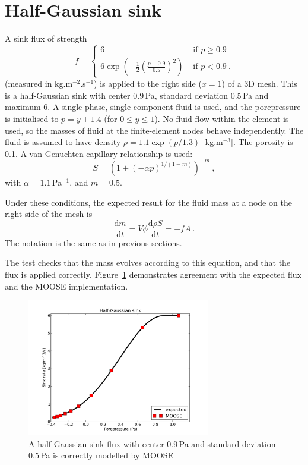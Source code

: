 \documentclass[]{scrreprt}
\def\d{\mathrm{d}}
\begin{document}
\section{Half-Gaussian sink}
\label{half_gaussian.sec}

A sink flux of strength
\begin{equation}
f = \left\{
\begin{array}{ll}
6 & \mbox{ if } p \geq 0.9 \\
6\exp\left(-\frac{1}{2} \left(\frac{p-0.9}{0.5} \right)^{2}\right) & \mbox { if } p < 0.9 \ .
\end{array}
\right.
\end{equation}
(measured in kg.m$^{-2}$.s$^{-1}$) is applied to the right side
($x=1$) of a 3D mesh.  This is a half-Gaussian sink with center
0.9\,Pa, standard deviation 0.5\,Pa and maximum 6.  A single-phase,
single-component fluid is used, and the porepressure is initialised to
$p=y+1.4$ (for $0\leq y \leq 1$).  No fluid flow within the element is
used, so the masses of fluid at the finite-element nodes behave
independently.  The fluid is assumed to have density $\rho = 1.1
\exp(p/1.3)$ [kg.m$^{-3}$].  The porosity is 0.1.  A van-Genuchten capillary
relationship is used:
\begin{equation}
S = \left( 1 + (-\alpha p)^{1/(1-m)} \right)^{-m} \ ,
\end{equation}
with $\alpha = 1.1$\,Pa$^{-1}$, and $m=0.5$.

Under these conditions, the expected result for the fluid mass at a
node on the right side of the mesh is
\begin{equation}
\frac{\d m}{\d t} = V\phi \frac{\d \rho S}{\d t} = -f A \ .
\end{equation}
The notation is the same as in previous sections.

The test checks that the mass evolves according to this equation, and
that the flux is applied correctly.  Figure~\ref{s05.fig} demonstrates
agreement with the expected flux and the MOOSE implementation.

\begin{figure}[htb]
\begin{center}
\includegraphics[width=8cm]{s05.pdf}
\caption{A half-Gaussian sink flux with center 0.9\,Pa and standard
  deviation 0.5\,Pa is correctly modelled by MOOSE}
\label{s05.fig}
\end{center}
\end{figure}
\end{document}
